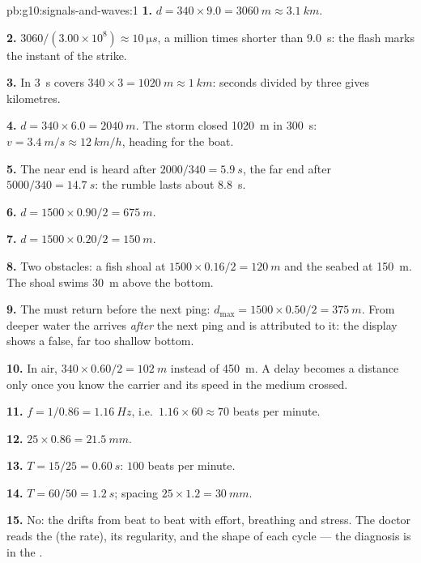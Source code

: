 \begin{solution}{pb:g10:signals-and-waves:1}
\textbf{1.} $d = 340 \times 9.0 = \qty{3060}{m} \approx \qty{3.1}{km}$.

\textbf{2.} $3060/(3.00\times10^{8}) \approx \qty{10}{\micro s}$, a
million times shorter than \qty{9.0}{s}: the flash marks the instant of
the strike.

\textbf{3.} In \qty{3}{s}  covers $340 \times 3 = \qty{1020}{m}
\approx \qty{1}{km}$: seconds divided by three gives kilometres.

\textbf{4.} $d = 340 \times 6.0 = \qty{2040}{m}$. The storm closed
\qty{1020}{m} in \qty{300}{s}: $v = \qty{3.4}{m/s} \approx
\qty{12}{km/h}$, heading for the boat.

\textbf{5.} The near end is heard after $2000/340 = \qty{5.9}{s}$, the
far end after $5000/340 = \qty{14.7}{s}$: the rumble lasts about
\qty{8.8}{s}.

\textbf{6.} $d = 1500 \times 0.90/2 = \qty{675}{m}$.

\textbf{7.} $d = 1500 \times 0.20/2 = \qty{150}{m}$.

\textbf{8.} Two obstacles: a fish shoal at $1500 \times 0.16/2 =
\qty{120}{m}$ and the seabed at \qty{150}{m}. The shoal swims
\qty{30}{m} above the bottom.

\textbf{9.} The  must return before the next ping:
$d_{\max} = 1500 \times 0.50/2 = \qty{375}{m}$. From deeper water the
 arrives \emph{after} the next ping and is attributed to it: the
display shows a false, far too shallow bottom.

\textbf{10.} In air, $340 \times 0.60/2 = \qty{102}{m}$ instead of
\qty{450}{m}. A delay becomes a distance only once you know the carrier
and its speed in the medium crossed.

\textbf{11.} $f = 1/0.86 = \qty{1.16}{Hz}$, i.e.\ $1.16 \times 60
\approx 70$ beats per minute.

\textbf{12.} $25 \times 0.86 = \qty{21.5}{mm}$.

\textbf{13.} $T = 15/25 = \qty{0.60}{s}$: $100$ beats per minute.

\textbf{14.} $T = 60/50 = \qty{1.2}{s}$; spacing
$25 \times 1.2 = \qty{30}{mm}$.

\textbf{15.} No: the  drifts from beat to beat with effort,
breathing and stress. The doctor reads the  (the rate), its
regularity, and the shape of each cycle --- the diagnosis is in the
.


\end{solution}
